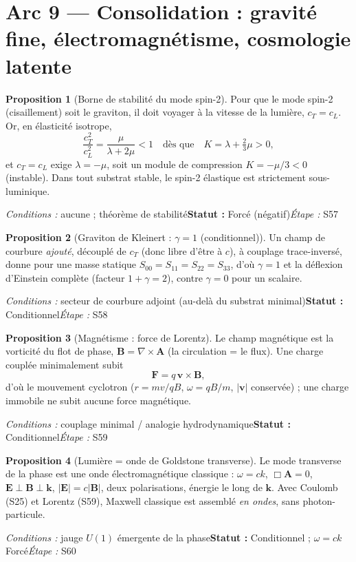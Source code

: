 \documentclass[11pt,a4paper]{article}
\theoremstyle{definition}
\newtheorem{prop}{Proposition}
\newcommand{\statut}[3]{\par\smallskip\noindent\textit{Conditions :} #1\quad\textbf{Statut :} #2\quad\textit{Étape :} #3\par\medskip}
\begin{document}
\section*{Arc 9 — Consolidation : gravité fine, électromagnétisme, cosmologie latente}

\begin{prop}[Borne de stabilité du mode spin-2]
Pour que le mode spin-2 (cisaillement) soit le graviton, il doit voyager à la vitesse de la lumière, $c_T=c_L$. Or, en élasticité isotrope,
\[ \frac{c_T^2}{c_L^2}=\frac{\mu}{\lambda+2\mu}<1\quad\text{dès que}\quad K=\lambda+\tfrac{2}{3}\mu>0, \]
et $c_T=c_L$ exige $\lambda=-\mu$, soit un module de compression $K=-\mu/3<0$ (instable). Dans tout substrat stable, le spin-2 élastique est strictement sous-luminique.
\end{prop}
\statut{aucune ; théorème de stabilité}{Forcé (négatif)}{S57}

\begin{prop}[Graviton de Kleinert : $\gamma=1$ (conditionnel)]
Un champ de courbure \emph{ajouté}, découplé de $c_T$ (donc libre d'être à $c$), à couplage trace-inversé, donne pour une masse statique $S_{00}=S_{11}=S_{22}=S_{33}$, d'où $\gamma=1$ et la déflexion d'Einstein complète (facteur $1+\gamma=2$), contre $\gamma=0$ pour un scalaire.
\end{prop}
\statut{secteur de courbure adjoint (au-delà du substrat minimal)}{Conditionnel}{S58}

\begin{prop}[Magnétisme : force de Lorentz]
Le champ magnétique est la vorticité du flot de phase, $\mathbf B=\nabla\times\mathbf A$ (la circulation = le flux). Une charge couplée minimalement subit
\[ \mathbf F=q\,\mathbf v\times\mathbf B, \]
d'où le mouvement cyclotron ($r=mv/qB$, $\omega=qB/m$, $|\mathbf v|$ conservée) ; une charge immobile ne subit aucune force magnétique.
\end{prop}
\statut{couplage minimal / analogie hydrodynamique}{Conditionnel}{S59}

\begin{prop}[Lumière = onde de Goldstone transverse]
Le mode transverse de la phase est une onde électromagnétique classique : $\omega=ck$, $\Box\mathbf A=0$, $\mathbf E\perp\mathbf B\perp\mathbf k$, $|\mathbf E|=c|\mathbf B|$, deux polarisations, énergie le long de $\mathbf k$. Avec Coulomb (S25) et Lorentz (S59), Maxwell classique est assemblé \emph{en ondes}, sans photon-particule.
\end{prop}
\statut{jauge $U(1)$ émergente de la phase}{Conditionnel ; $\omega=ck$ Forcé}{S60}
\end{document}
